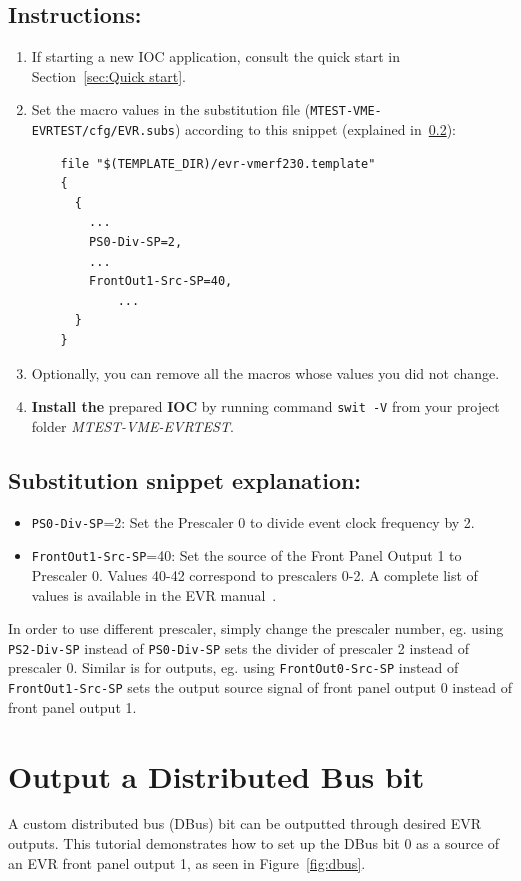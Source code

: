 \documentclass[12pt,a4paper]{article}
\begin{document}
\subsection{Instructions:}
\begin{enumerate}
	\item If starting a new IOC application, consult the quick start in Section~\ref{sec:Quick start}.

	\item Set the macro values in the substitution file (\texttt{MTEST-VME-EVRTEST/cfg/EVR.subs}) according to this snippet (explained in~\ref{sec:explain_clock}):
\begin{verbatim}
	file "$(TEMPLATE_DIR)/evr-vmerf230.template"
	{
	  {
	    ...
	    PS0-Div-SP=2,
	    ...
	    FrontOut1-Src-SP=40,
		    ...
	  }
	}
\end{verbatim}

	\item Optionally, you can remove all the macros whose values you did not change. 
	\item \textbf{Install the} prepared \textbf{IOC} by running command \texttt{swit -V} from your project folder \textit{MTEST-VME-EVRTEST}.
\end{enumerate}

\subsection{Substitution snippet explanation:}\label{sec:explain_clock}
\begin{itemize}
	\item \texttt{PS0-Div-SP}=2: Set the Prescaler 0 to divide event clock frequency by 2.
	\item \texttt{FrontOut1-Src-SP}=40: Set the source of the Front Panel Output 1 to Prescaler 0. Values 40-42 correspond to prescalers 0-2. A complete list of values is available in the EVR manual~\cite{evr_manual}.
\end{itemize}

In order to use different prescaler, simply change the prescaler number, eg. using \texttt{PS2-Div-SP} instead of \texttt{PS0-Div-SP} sets the divider of prescaler 2 instead of prescaler 0.
Similar is for outputs, eg. using \texttt{FrontOut0-Src-SP} instead of \texttt{FrontOut1-Src-SP} sets the output source signal of front panel output 0 instead of front panel output 1.

\section{Output a Distributed Bus bit}
A custom distributed bus (DBus) bit can be outputted through desired EVR outputs. This tutorial demonstrates how to set up the DBus bit 0 as a source of an EVR front panel output 1, as seen in Figure~\ref{fig:dbus}. 
\end{document}

